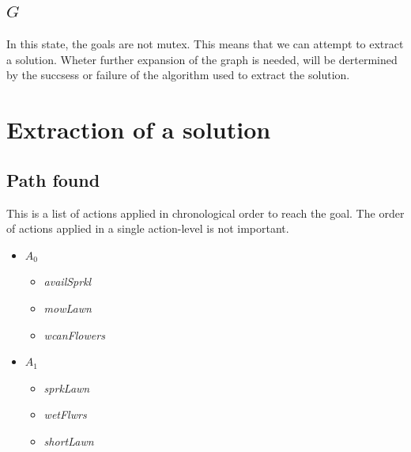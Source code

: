 \documentclass[english, a4paper]{article}
\begin{document}
\subsection{$G$}
In this state, the goals are not mutex. This means that we can attempt to extract a solution. Wheter further expansion of the graph is needed, will be dertermined by the succsess or failure of the algorithm used to extract the solution.

\section{Extraction of a solution}
\subsection{Path found}
This is a list of actions applied in chronological order to reach the goal. The order of actions applied in a single action-level is not important.
\begin{itemize}
\item $A_0$
	\begin{itemize}
	\item \emph{availSprkl}
	\item \emph{mowLawn}
	\item \emph{wcanFlowers}
	\end{itemize}
\item $A_1$
	\begin{itemize}
	\item \emph{sprkLawn}
	\item \emph{wetFlwrs}
	\item \emph{shortLawn}
	\end{itemize}
\end{itemize}
\end{document}
